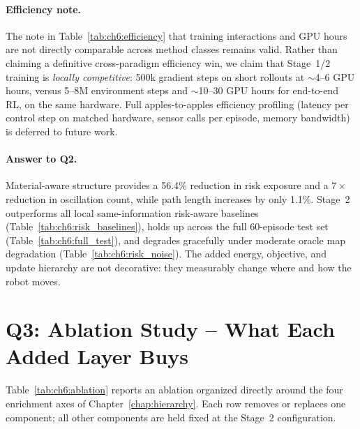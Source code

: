 \paragraph{Efficiency note.}
The note in Table~\ref{tab:ch6:efficiency} that training interactions and
GPU hours are not directly comparable across method classes remains valid.
Rather than claiming a definitive cross-paradigm efficiency win, we
claim that Stage~1/2 training is \emph{locally competitive}: 500k gradient
steps on short rollouts at $\sim$4--6 GPU hours, versus 5--8M environment
steps and $\sim$10--30 GPU hours for end-to-end RL, on the same hardware.
Full apples-to-apples efficiency profiling (latency per control step on
matched hardware, sensor calls per episode, memory bandwidth) is
deferred to future work.

\paragraph{Answer to Q2.}
Material-aware structure provides a 56.4\% reduction in risk exposure
and a $7\times$ reduction in oscillation count, while path length
increases by only 1.1\%.
Stage~2 outperforms all local same-information risk-aware baselines
(Table~\ref{tab:ch6:risk_baselines}), holds up across the full 60-episode
test set (Table~\ref{tab:ch6:full_test}), and degrades gracefully under
moderate oracle map degradation (Table~\ref{tab:ch6:risk_noise}).
The added energy, objective, and update hierarchy are not decorative:
they measurably change where and how the robot moves.

\section{Q3: Ablation Study -- What Each Added Layer Buys}
\label{sec:ch6:ablation}

Table~\ref{tab:ch6:ablation} reports an ablation organized directly
around the four enrichment axes of Chapter~\ref{chap:hierarchy}.
Each row removes or replaces one component; all other components
are held fixed at the Stage~2 configuration.

